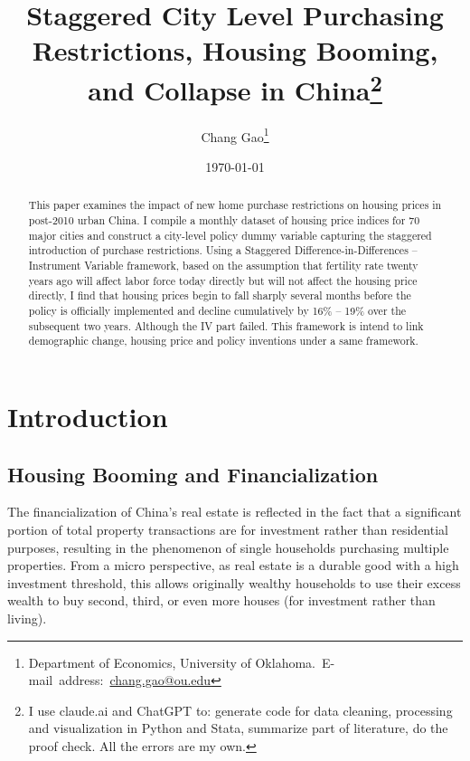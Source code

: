\documentclass[12pt,english]{article}
\begin{document}
	
	\begin{singlespace}
		\title{Staggered City Level Purchasing Restrictions, Housing Booming, and Collapse in China\thanks{I use claude.ai and ChatGPT to: generate code for data cleaning, processing and visualization in Python and Stata, summarize part of literature, do the proof check. All the errors are my own.}}
	\end{singlespace}
	
	\author{Chang Gao\thanks{Department of Economics, University of Oklahoma.\
			E-mail~address:~\href{mailto:chang.gao@ou.edu}{chang.gao@ou.edu}}}
	
	 \date{\today}

	
	\maketitle
	
	\begin{abstract}
		\begin{singlespace}
This paper examines the impact of new home purchase restrictions on housing prices in post-2010 urban China. I compile a monthly dataset of housing price indices for 70 major cities and construct a city-level policy dummy variable capturing the staggered introduction of purchase restrictions. Using a Staggered Difference-in-Differences -- Instrument Variable framework, based on the assumption that fertility rate twenty years ago will affect labor force today directly but will not affect the housing price directly, I find that housing prices begin to fall sharply several months before the policy is officially implemented and decline cumulatively by 16\% -- 19\% over the subsequent two years. Although the IV part failed. This framework is intend to link demographic change, housing price and policy inventions under a same framework.

		\end{singlespace}
		
	\end{abstract}
	\vfill{}
	
	
	\pagebreak{}
	
	
	\section{Introduction}\label{sec:intro}
	\subsection{Housing Booming and Financialization}
	The financialization of China's real estate is reflected in the fact that a significant portion of total property transactions are for investment rather than residential purposes, resulting in the phenomenon of single households purchasing multiple properties. From a micro perspective, as real estate is a durable good with a high investment threshold, this allows originally wealthy households to use their excess wealth to buy second, third, or even more houses (for investment rather than living).
	
\end{document}
